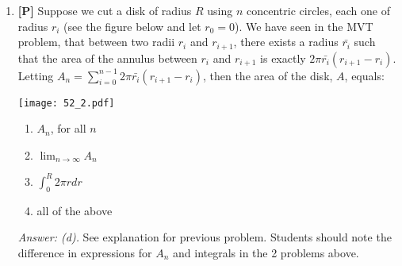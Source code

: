 \documentclass[12pt]{article}
\begin{document}
\begin{enumerate}
\begin{center}
%
\texttt{[image: 52\_1.pdf]}
\end{center}

We let $\displaystyle{A_n= \sum_{i=0}^{n-1} \frac{1}{2}r^2\; \Delta\theta}$.
Then the area of the disk, $A$, is given by:
\begin{enumerate}
\item $A_n$, independent of how many sectors we cut the disk into.
\item $\displaystyle{\lim_{n \to \infty} A_n}$ 
\item $\int_0^{2\pi}\frac{1}{2}r^2 d\theta$
\item all of the above
\end{enumerate}

{\it Answer: (d).} Recall the pizza problem (\#4 in Section 3.1, \#4 in Section 4.2). 
Students should easily see that (b) and (c) are equivalent. However, 
$\displaystyle{\lim_{n \to \infty} A_n}=A_n$ for all $n$. 
There is a point to be made about smarter and more efficient ways to estimate integrals, other
than doing it with rectangles. The instructor should demonstrate
to the students that the sum of the areas of sectors is the area of the whole disk.


\bigskip

\item {\bf [P]} Suppose we cut a disk of radius $R$ using $n$
concentric circles, each one of radius $r_i$ (see the figure below
and let $r_0 =0$). We have seen in the MVT problem, that between
two radii $r_i$ and $r_{i+1}$, there exists a radius $\bar{r_i}$
such that the area of the annulus between $r_i$ and $r_{i+1}$ is
exactly $2\pi \bar{r_i}(r_{i+1}-r_{i})$.
Letting $\displaystyle{A_n =\sum_{i=0}^{n-1} 2\pi \bar{r_i}(r_{i+1}-r_{i})}$,
then the area of the disk, $A$, equals:

\begin{center}
%
\texttt{[image: 52\_2.pdf]}
\end{center}

\begin{enumerate}
\item $A_n$, for all $n$
\item $\displaystyle{\lim_{n \to \infty} A_n}$ 
\item $\int_0^R 2\pi r dr$
\item all of the above
\end{enumerate}

{\it Answer: (d).} See explanation for previous problem. Students should note the difference in expressions for $A_n$ and integrals in the 2 problems above.
\bigskip


\end{enumerate}
\end{document}

